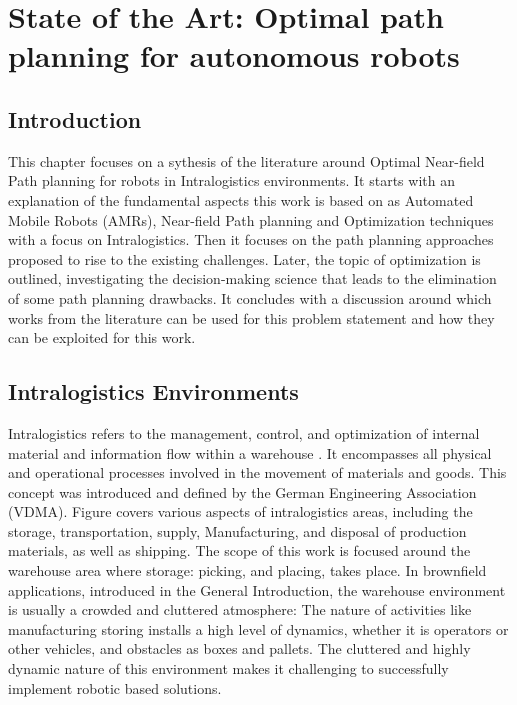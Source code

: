 \chapter{State of the Art: Optimal path planning for autonomous robots}

\renewcommand{\chaptername}{Chapter}

\section*{Introduction}
This chapter focuses on a sythesis of the literature around Optimal Near-field Path planning
for robots in Intralogistics environments. 
It starts with an explanation of the fundamental aspects this work is based on 
as Automated Mobile Robots (AMRs), Near-field Path planning and Optimization techniques 
with a focus on Intralogistics.
Then it focuses on the path planning approaches proposed to rise to the existing challenges.
Later, the topic of optimization is outlined, investigating the decision-making science
that leads to the elimination of some path planning drawbacks.
It concludes with a discussion around which works from the literature can be used for this problem 
statement and how they can be exploited for this work.

\section{Intralogistics Environments}
Intralogistics refers to the management, control, and optimization of internal material and 
information flow within a warehouse . It encompasses all physical and operational processes 
involved in the movement of materials and goods. This concept was introduced and defined by 
the German Engineering Association (VDMA). Figure  covers various aspects of 
intralogistics areas, including 
the storage, transportation, supply, Manufacturing, and disposal of production materials, as well as 
shipping. 
The scope of this work is focused around the warehouse 
area where storage: picking, and placing, takes place. 
In brownfield applications, introduced in the General Introduction, the warehouse environment is 
usually a crowded and cluttered 
atmosphere: The nature of activities like manufacturing storing installs a high level of 
dynamics, whether it is operators or other vehicles, and obstacles as boxes and pallets. 
The cluttered 
and highly dynamic nature of this environment makes it challenging to successfully 
implement robotic based solutions.

